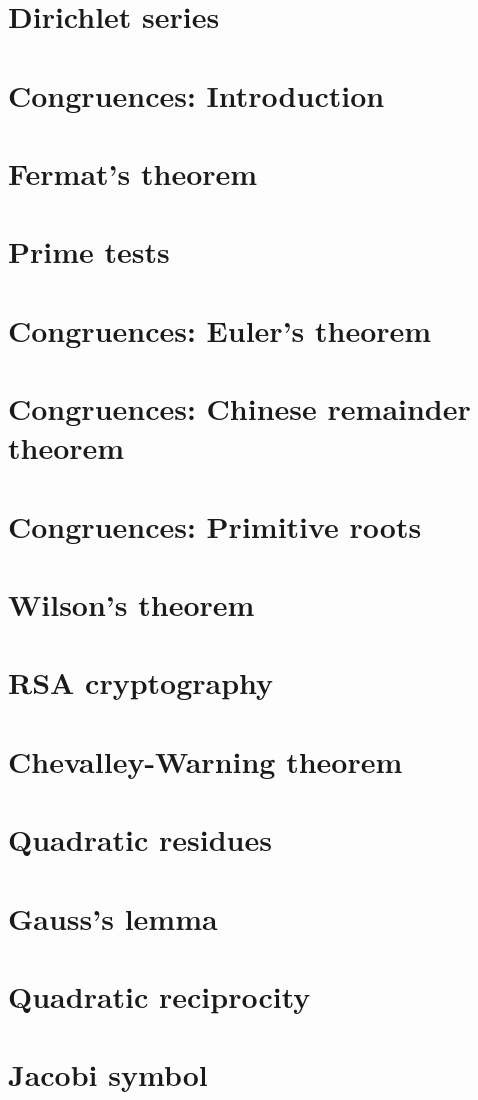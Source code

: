 \documentclass{article}
\begin{document}
\section{Dirichlet series}
\section{Congruences: Introduction}
\section{Fermat's theorem}
\section{Prime tests}
\section{Congruences: Euler's theorem}
\section{Congruences: Chinese remainder theorem}
\section{Congruences: Primitive roots}
\section{Wilson's theorem}
\section{RSA cryptography}
\section{Chevalley-Warning theorem}
\section{Quadratic residues}
\section{Gauss's lemma}
\section{Quadratic reciprocity}
\section{Jacobi symbol}
\end{document}
